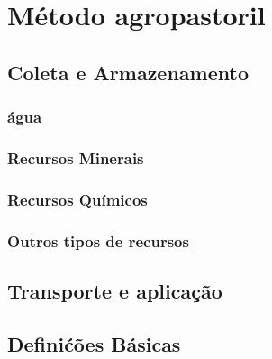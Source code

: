 \section{M\'{e}todo agropastoril}

\subsection{Coleta e Armazenamento}

\subsubsection{\'{a}gua}

\subsubsection{Recursos Minerais}

\subsubsection{Recursos Qu\'{i}micos}

\subsubsection{Outros tipos de recursos}

\subsection{Transporte e aplica\c{c}\~{a}o}

\subsection{Defini\'{c}\~{o}es B\'{a}sicas}
